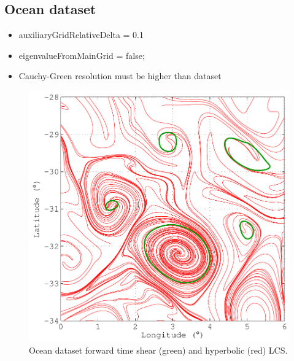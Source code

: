 \documentclass{article}
\begin{document}
\subsection{Ocean dataset}

\begin{itemize}
\item auxiliaryGridRelativeDelta = 0.1
\item eigenvalueFromMainGrid = false;
\item Cauchy-Green resolution must be higher than dataset
\end{itemize}

\begin{figure}
\begin{center}
\includegraphics[width=\textwidth]{graphics/ocean_dataset/hyperbolic_shear_lcs_strainline}
\end{center}
\caption{Ocean dataset forward time shear (green) and hyperbolic (red) LCS.}
\label{f:ocean dataset hyperbolic shear lcs strainline}
\end{figure}
\end{document}
